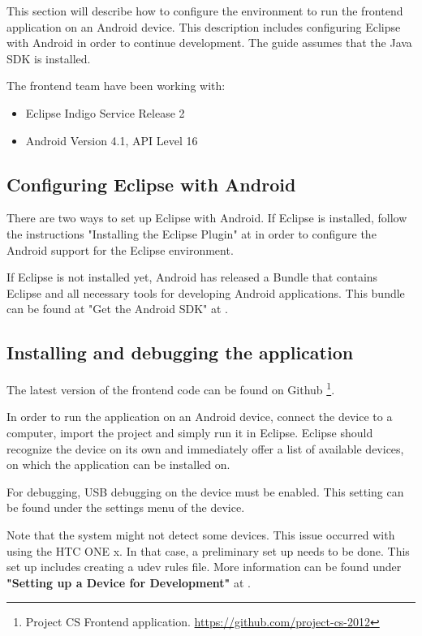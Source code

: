 This section will describe how to configure the environment to run the frontend application on an Android device. 
This description includes configuring Eclipse with Android in order to continue development. 
The guide assumes that the Java SDK is installed.

The frontend team have been working with:
\begin{itemize}
\item Eclipse Indigo Service Release 2
\item Android Version 4.1, API Level 16
\end{itemize}

\subsection{Configuring Eclipse with Android}
There are two ways to set up Eclipse with Android.
If Eclipse is installed, follow
the instructions "Installing the Eclipse Plugin" 
at \cite{android} in order to configure the 
Android support for the Eclipse environment.

If Eclipse is not installed yet, Android has released a Bundle that contains Eclipse and all 
necessary tools for developing Android applications.
This bundle can be found at "Get the Android SDK" at \cite{android}.

\subsection{Installing and debugging the application}
The latest version of the frontend code can be found on Github \footnote{Project CS Frontend application. \url{https://github.com/project-cs-2012}}.

In order to run the application on an Android device, connect the device
to a computer, import the project and simply run it in Eclipse. 
Eclipse should recognize the device on its own and immediately offer a list
of available devices, on which the application can be installed on.

For debugging, USB debugging on the device must be enabled.
This setting can be found under the settings menu of the device.

Note that the system might not detect some devices. This issue occurred with
using the HTC ONE x. In that case, a preliminary set up needs to be done.
This set up includes creating a udev rules file. More information
can be found under \textbf{"Setting up a Device for Development"} at
\cite{android}.



